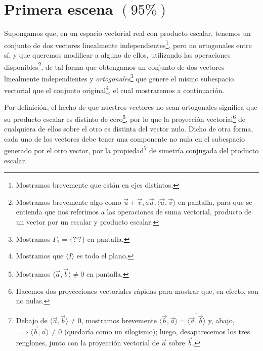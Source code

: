 \documentclass[12pt,dvipsnames]{article}
\numberwithin{equation}{section}
\begin{document}

\newpage
\section{Primera escena $(95\%)$}

Supongamos que, en un espacio vectorial real con producto escalar, tenemos un conjunto de dos vectores linealmente independientes\footnote{Mostramos brevemente que están en ejes distintos.}, pero no ortogonales entre sí, y que queremos modificar a alguno de ellos, utilizando las operaciones disponibles\footnote{Mostramos brevemente algo como $\vec{u}+\vec{v}, a\vec{u}, \langle\vec{u},\vec{v}\rangle$ en pantalla, para que se entienda que nos referimos a las operaciones de suma vectorial, producto de un vector por un escalar y producto escalar.}, de tal forma que obtengamos un conjunto de dos vectores linealmente independientes y \emph{ortogonales}\footnote{Mostramos $\Gamma_1=\{ \text{?`} ? \}$ en pantalla.} que genere el mismo subespacio vectorial que el conjunto original\footnote{Mostramos que $\langle I\rangle$ es todo el plano.}, el cual mostraremos a continuación.

Por definición, el hecho de que nuestros vectores no sean ortogonales significa que su producto escalar es distinto de cero\footnote{Mostramos $\langle \vec{a},\vec{b}\rangle\neq0$ en pantalla.}, por lo que la proyección vectorial\footnote{Hacemos dos proyecciones vectoriales rápidas para mostrar que, en efecto, son no nulas.} de cualquiera de ellos sobre el otro es distinta del vector nulo. Dicho de otra forma, cada uno de los vectores debe tener una componente no nula en el subespacio generado por el otro vector, por la propiedad\footnote{Debajo de $\langle\vec{a},\vec{b}\rangle\neq0$, mostramos brevemente $\langle \vec{b},\vec{a}\rangle = \overline{\langle \vec{a},\vec{b}\rangle}$ y, abajo, $\implies \langle\vec{b},\vec{a}\rangle\neq0$ (quedaría como un silogismo); luego, desaparecemos los tres renglones, junto con la proyección vectorial de $\vec{a}$ sobre $\vec{b}$.} de simetría conjugada del producto escalar.
\end{document}
